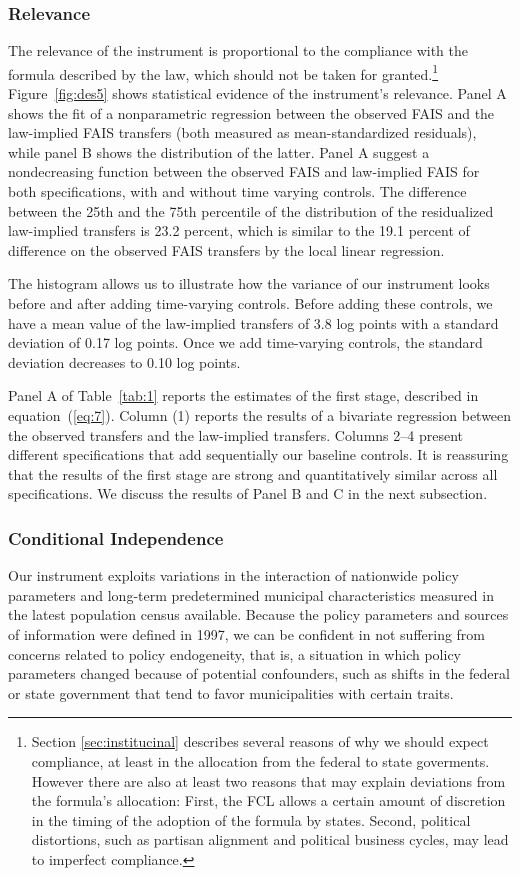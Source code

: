 \documentclass[dv_diss_main.tex]{subfiles}
\begin{document}
\subsubsection{Relevance} The relevance of the instrument is proportional to the compliance with the formula described by the law, which should not be taken for granted.\footnote{Section \ref{sec:institucinal} describes several reasons of why we should expect compliance, at least in the allocation from the federal to state goverments. However there are also at least two reasons that may explain deviations from the formula's allocation: First, the FCL allows a certain amount of discretion in the timing of the adoption of the formula by states. Second, political distortions, such as partisan alignment and political business cycles, may lead to imperfect compliance.} {Figure}~\ref{fig:des5} shows statistical evidence of the instrument’s relevance. Panel A shows the fit of a nonparametric regression between the observed FAIS and the law-implied FAIS transfers (both measured as mean-standardized residuals), while panel B shows the distribution of the latter. Panel A suggest a nondecreasing function between the observed FAIS and law-implied FAIS for both specifications, with and without time varying controls. The difference between the 25th and the 75th percentile of the distribution of the residualized law-implied transfers is 23.2 percent, which is similar to the 19.1 percent of difference on the observed FAIS transfers by the local linear regression.


The histogram allows us to illustrate how the variance of our instrument looks before and after adding time-varying controls. Before adding these controls, we have a mean value of the law-implied transfers of 3.8 log points with a standard deviation of 0.17 log points. Once we add time-varying controls, the standard deviation decreases to 0.10 log points.

Panel A of {Table}~\ref{tab:1} reports the estimates of the first stage, described in {equation}~(\ref{eq:7}). Column (1) reports the results of a bivariate regression between the observed transfers and the law-implied transfers. Columns 2–4 present different specifications that add sequentially our baseline controls. It is reassuring that the results of the first stage are strong and quantitatively similar across all specifications. We discuss the results of Panel B and C in the next subsection.


\subsubsection{Conditional Independence} Our instrument exploits variations in the interaction of nationwide policy parameters and long-term predetermined municipal characteristics measured in the latest population census available. Because the policy parameters and sources of information were defined in 1997, we can be confident in not suffering from concerns related to policy endogeneity, that is, a situation in which policy parameters changed because of potential confounders, such as shifts in the federal or state government that tend to favor municipalities with certain traits.
\end{document}
